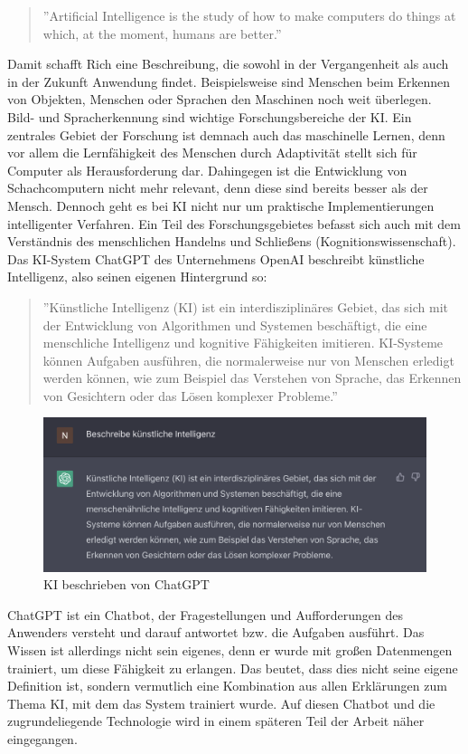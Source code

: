 \documentclass[a4paper,12pt, german]{report}
\begin{document}
\begin{quote}
''Artificial Intelligence is the study of how to make computers do things at which, at the moment, humans are better.''
\end{quote} 
Damit schafft Rich eine Beschreibung, die sowohl in der Vergangenheit als auch in der Zukunft Anwendung findet. Beispielsweise sind Menschen beim Erkennen von Objekten, Menschen oder Sprachen den Maschinen noch weit überlegen. Bild- und Spracherkennung sind wichtige Forschungsbereiche der KI. Ein zentrales Gebiet der Forschung ist demnach auch das maschinelle Lernen, denn vor allem die Lernfähigkeit des Menschen durch Adaptivität stellt sich für Computer als Herausforderung dar. Dahingegen ist die Entwicklung von Schachcomputern nicht mehr relevant, denn diese sind bereits besser als der Mensch. Dennoch geht es bei KI nicht nur um praktische Implementierungen intelligenter Verfahren. Ein Teil des Forschungsgebietes befasst sich auch mit dem Verständnis des menschlichen Handelns und Schließens (Kognitionswissenschaft).\cite{11} \newline
Das KI-System ChatGPT des Unternehmens OpenAI beschreibt künstliche Intelligenz, also seinen eigenen Hintergrund so\cite{04}:
\begin{quote}
  ''Künstliche Intelligenz (KI) ist ein interdisziplinäres Gebiet, das sich mit der Entwicklung von Algorithmen und Systemen beschäftigt, die eine menschliche Intelligenz und kognitive Fähigkeiten imitieren. KI-Systeme können Aufgaben ausführen, die normalerweise nur von Menschen erledigt werden können, wie zum Beispiel das Verstehen von Sprache, das Erkennen von Gesichtern oder das Lösen komplexer Probleme.''
\end{quote}

\begin{figure}
  \center
 \includegraphics[width=14cm]{images/ChatGPT.png}
  \caption[KI beschrieben von ChatGPT]{KI beschrieben von ChatGPT \cite{04}}
\end{figure}
ChatGPT ist ein Chatbot, der Fragestellungen und Aufforderungen des Anwenders versteht und darauf antwortet bzw. die Aufgaben ausführt. Das Wissen ist allerdings nicht sein eigenes, denn er wurde mit großen Datenmengen trainiert, um diese Fähigkeit zu erlangen. Das beutet, dass dies nicht seine eigene Definition ist, sondern vermutlich eine Kombination aus allen Erklärungen zum Thema KI, mit dem das System trainiert wurde. Auf diesen Chatbot und die zugrundeliegende Technologie wird in einem späteren Teil der Arbeit näher eingegangen.
\end{document}
